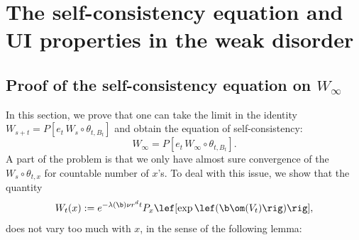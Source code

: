 \section{The self-consistency equation and UI properties in the weak disorder}
\subsection{Proof of the self-consistency equation on $W_\infty$} \label{sec:proofSelfconsistent}
In this section, we prove that one can take the limit in the identity $W_{s+t} = P [e_{t} \, W_s \circ \theta_{t,B_t}]$ and obtain the  equation of self-consistency:
\begin{equation}
\label{eq:self_consistent_equation}
W_\infty = P [e_{t} \, W_\infty \circ \theta_{t,B_t} ].
\end{equation}
A part of the problem is that we only have almost sure convergence of the $W_s \circ \theta_{t,x}$ for countable number of $x$'s. 
To deal with this issue, we show that the quantity
\begin{equation}W_t(x) := e^{-\lambda (\b)\nu r^d t} P_x\lef[\exp \lef(\b \om(V_t) \rig) \rig],
\end{equation} 
does not vary too much with $x$, in the sense of the following lemma:


